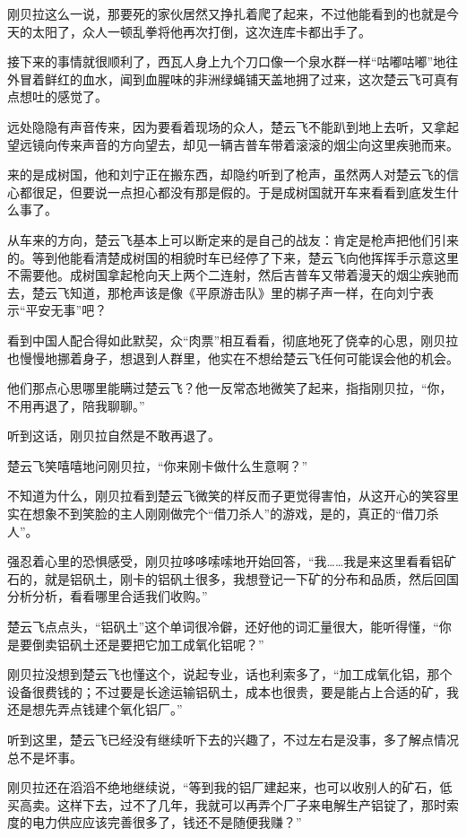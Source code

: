 刚贝拉这么一说，那要死的家伙居然又挣扎着爬了起来，不过他能看到的也就是今天的太阳了，众人一顿乱拳将他再次打倒，这次连库卡都出手了。

接下来的事情就很顺利了，西瓦人身上九个刀口像一个泉水群一样“咕嘟咕嘟”地往外冒着鲜红的血水，闻到血腥味的非洲绿蝇铺天盖地拥了过来，这次楚云飞可真有点想吐的感觉了。

远处隐隐有声音传来，因为要看着现场的众人，楚云飞不能趴到地上去听，又拿起望远镜向传来声音的方向望去，却见一辆吉普车带着滚滚的烟尘向这里疾驰而来。

来的是成树国，他和刘宁正在搬东西，却隐约听到了枪声，虽然两人对楚云飞的信心都很足，但要说一点担心都没有那是假的。于是成树国就开车来看看到底发生什么事了。

从车来的方向，楚云飞基本上可以断定来的是自己的战友：肯定是枪声把他们引来的。等到他能看清楚成树国的相貌时车已经停了下来，楚云飞向他挥挥手示意这里不需要他。成树国拿起枪向天上两个二连射，然后吉普车又带着漫天的烟尘疾驰而去，楚云飞知道，那枪声该是像《平原游击队》里的梆子声一样，在向刘宁表示“平安无事”吧？

看到中国人配合得如此默契，众“肉票”相互看看，彻底地死了侥幸的心思，刚贝拉也慢慢地挪着身子，想退到人群里，他实在不想给楚云飞任何可能误会他的机会。

他们那点心思哪里能瞒过楚云飞？他一反常态地微笑了起来，指指刚贝拉，“你，不用再退了，陪我聊聊。”

听到这话，刚贝拉自然是不敢再退了。

楚云飞笑嘻嘻地问刚贝拉，“你来刚卡做什么生意啊？”

不知道为什么，刚贝拉看到楚云飞微笑的样反而子更觉得害怕，从这开心的笑容里实在想象不到笑脸的主人刚刚做完个“借刀杀人”的游戏，是的，真正的“借刀杀人”。

强忍着心里的恐惧感受，刚贝拉哆哆嗦嗦地开始回答，“我……我是来这里看看铝矿石的，就是铝矾土，刚卡的铝矾土很多，我想登记一下矿的分布和品质，然后回国分析分析，看看哪里合适我们收购。”

楚云飞点点头，“铝矾土”这个单词很冷僻，还好他的词汇量很大，能听得懂，“你是要倒卖铝矾土还是要把它加工成氧化铝呢？”

刚贝拉没想到楚云飞也懂这个，说起专业，话也利索多了，“加工成氧化铝，那个设备很费钱的；不过要是长途运输铝矾土，成本也很贵，要是能占上合适的矿，我还是想先弄点钱建个氧化铝厂。”

听到这里，楚云飞已经没有继续听下去的兴趣了，不过左右是没事，多了解点情况总不是坏事。

刚贝拉还在滔滔不绝地继续说，“等到我的铝厂建起来，也可以收别人的矿石，低买高卖。这样下去，过不了几年，我就可以再弄个厂子来电解生产铝锭了，那时索度的电力供应应该完善很多了，钱还不是随便我赚？”

